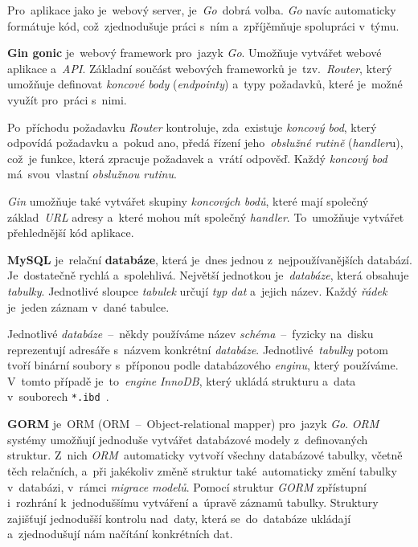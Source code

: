 \documentclass[11pt,a4paper]{report}
\begin{document}
            Pro~aplikace jako je~webový server, je~\emph{Go}~dobrá volba. \emph{Go} navíc automaticky formátuje kód, což~zjednodušuje práci s~ním a~zpříjěmňuje spolupráci v~týmu.

            \textbf{Gin gonic} je~webový framework pro~jazyk \emph{Go}. Umožňuje vytvářet webové aplikace a~\emph{API}. Základní součást webových frameworků je~tzv.~\emph{Router}, který umožňuje definovat \emph{koncové body} (\emph{endpointy}) a~typy požadavků, které je~možné využít pro~práci s~nimi.
            
            Po~příchodu požadavku \emph{Router} kontroluje, zda~existuje \emph{koncový bod}, který odpovídá požadavku a~pokud ano, předá řízení jeho~\emph{obslužné rutině} (\emph{handler}u), což~je funkce, která zpracuje požadavek a~vrátí odpověď. Každý \emph{koncový bod} má~svou~vlastní \emph{obslužnou rutinu}.
            
            \emph{Gin} umožňuje také vytvářet skupiny \emph{koncových bodů}, které mají společný základ~\emph{URL} adresy a~které mohou mít společný \emph{handler}. To~umožňuje vytvářet přehlednější kód aplikace.
            
            \textbf{MySQL} je~relační \textbf{databáze}, která je~dnes jednou z~nejpoužívanějších databází. Je~dostatečně rychlá a~spolehlivá. Největší jednotkou je~\emph{databáze}, která obsahuje \emph{tabulky}. Jednotlivé sloupce \emph{tabulek} určují \emph{typ dat} a~jejich název. Každý \emph{řádek} je~jeden záznam v~dané tabulce.\cite{databases21}
            
            Jednotlivé \emph{databáze}~--~někdy používáme název \emph{schéma}~--~fyzicky na~disku reprezentují adresáře s~názvem konkrétní \emph{databáze}. Jednotlivé~\emph{tabulky} potom tvoří binární soubory s~příponou podle databázového \emph{enginu}, který používáme. V~tomto případě je~to~\emph{engine} \emph{InnoDB}, který ukládá strukturu a~data v~souborech \texttt{*.ibd}~\cite{MySQLInnoDB}.
            
            \textbf{GORM} je~ORM (ORM~--~Object-relational mapper) pro~jazyk \emph{Go}. \emph{ORM} systémy umožňují jednoduše vytvářet databázové modely z~definovaných struktur. Z~nich \emph{ORM}~automaticky vytvoří všechny databázové tabulky, včetně těch relačních, a~při jakékoliv změně struktur také~automaticky změní tabulky v~databázi, v~rámci \emph{migrace modelů}. Pomocí struktur \emph{GORM} zpřístupní i~rozhrání k~jednoduššímu vytváření a~úpravě záznamů tabulky. Struktury zajišťují jednodušší kontrolu nad~daty, která se~do~databáze ukládají a~zjednodušují nám načítání konkrétních dat.
\end{document}
